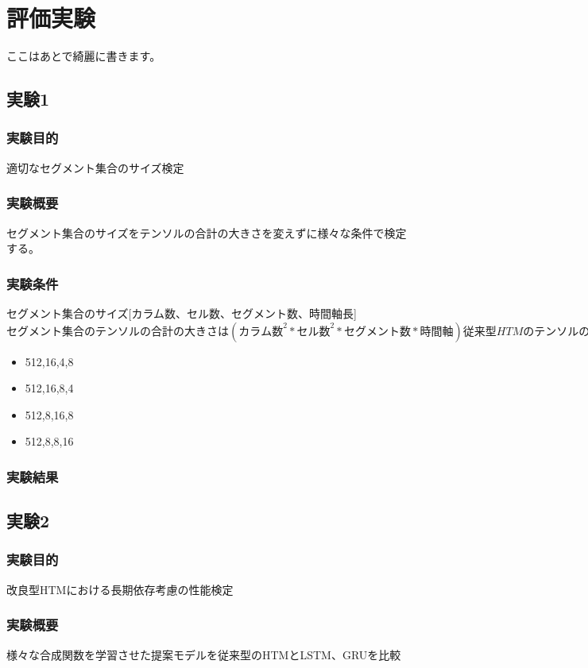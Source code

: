\chapter{評価実験}
ここはあとで綺麗に書きます。

\section{実験1}
\subsection{実験目的}
適切なセグメント集合のサイズ検定

\subsection{実験概要}
セグメント集合のサイズをテンソルの合計の大きさを変えずに様々な条件で検定する。

\subsection{実験条件}
セグメント集合のサイズ[カラム数、セル数、セグメント数、時間軸長]
$セグメント集合のテンソルの合計の大きさは(カラム数^2*セル数^2*セグメント数*時間軸)
従来型HTMのテンソルの合計サイズ(512,16,32,1)の場合512^2*16^2*32*1=2^31$

\begin{itemize}
  \item 512,16,4,8
  \item 512,16,8,4
  \item 512,8,16,8
  \item 512,8,8,16
\end{itemize}

\subsection{実験結果}

\section{実験2}
\subsection{実験目的}
改良型HTMにおける長期依存考慮の性能検定

\subsection{実験概要}
様々な合成関数を学習させた提案モデルを従来型のHTMとLSTM、GRUを比較

